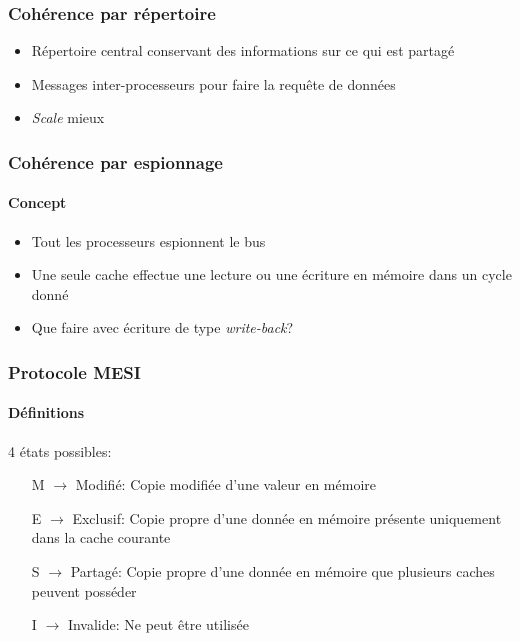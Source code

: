 \documentclass{beamer}
\begin{document}
\begin{frame}
\frametitle{Cohérence par répertoire}
\begin{itemize}
\item Répertoire central conservant des informations sur ce qui est partagé
\item Messages inter-processeurs pour faire la requête de données
\item \textit{Scale} mieux
\end{itemize}
\end{frame}

\begin{frame}
\frametitle{Cohérence par espionnage}
\framesubtitle{Concept}
\begin{itemize}
\item Tout les processeurs espionnent le bus
\item Une seule cache effectue une lecture ou une écriture en mémoire dans un cycle donné
\item Que faire avec écriture de type \textit{write-back}?
\end{itemize}
\end{frame}

\begin{frame}
\frametitle{Protocole MESI}
\framesubtitle{Définitions}
4 états possibles: 
\begin{itemize}
\item[M] $\rightarrow$ Modifié: Copie modifiée d'une valeur en mémoire
\item[E] $\rightarrow$ Exclusif: Copie propre d'une donnée en mémoire présente uniquement dans la cache courante
\item[S] $\rightarrow$ Partagé: Copie propre d'une donnée en mémoire que plusieurs caches peuvent posséder
\item[I] $\rightarrow$ Invalide: Ne peut être utilisée
\end{itemize}
\end{frame}
\end{document}
